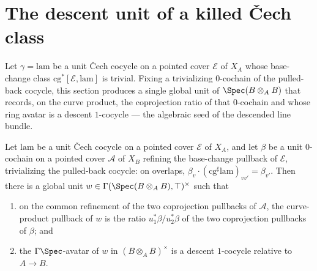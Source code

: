 \section{The descent unit of a killed \v Cech class}
\label{pa-sec:kernelDescentUnit}

Let \(\gamma = \mathrm{lam}\) be a unit \v Cech cocycle on a pointed cover \(\mathcal E\) of
\(X_A\) whose base-change class \(\mathrm{cg}^{*}[\mathcal E, \mathrm{lam}]\) is trivial. Fixing
a trivializing \(0\)-cochain of the pulled-back cocycle, this section produces a single global
unit of \(\Spec(B \otimes_A B)\) that records, on the curve product, the coprojection ratio of
that \(0\)-cochain and whose ring avatar is a descent \(1\)-cocycle — the algebraic seed of the
descended line bundle.

\begin{theorem}
  \label{pa-thm:exists_kernelDescentUnit}
  \leanok

  Let \(\mathrm{lam}\) be a unit \v Cech cocycle on a pointed cover \(\mathcal E\) of \(X_A\),
  and let \(\beta\) be a unit \(0\)-cochain on a pointed cover \(\mathcal A\) of \(X_B\) refining
  the base-change pullback of \(\mathcal E\), trivializing the pulled-back cocycle: on overlaps,
  \(\beta_v \cdot (\mathrm{cg}^{\sharp}\mathrm{lam})_{vv'} = \beta_{v'}\). Then there is a global
  unit \(w \in \Gamma(\Spec(B \otimes_A B), \top)^{\times}\) such that
  \begin{enumerate}
    \item on the common refinement of the two coprojection pullbacks of \(\mathcal A\), the
      curve-product pullback of \(w\) is the ratio \(u_1^{*}\beta / u_2^{*}\beta\) of the two
      coprojection pullbacks of \(\beta\); and
    \item the \(\Gamma\Spec\)-avatar of \(w\) in \((B \otimes_A B)^{\times}\) is a descent
      \(1\)-cocycle relative to \(A \to B\).
  \end{enumerate}
\end{theorem}

